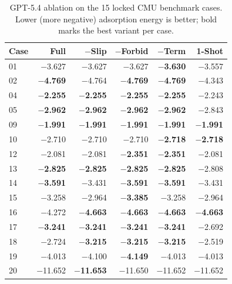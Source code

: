 \begin{table}[h]
\centering
\small
\caption{GPT-5.4 ablation on the 15 locked CMU benchmark cases. Lower (more negative) adsorption energy is better; bold marks the best variant per case.}
\label{tab:si-ablation-gpt54}
\begin{tabular}{lrrrrr}
\toprule
Case & Full & $-$Slip & $-$Forbid & $-$Term & 1-Shot \\
\midrule
01 & $-$3.627 & $-$3.627 & $-$3.627 & \textbf{$-$3.630} & $-$3.557 \\
02 & \textbf{$-$4.769} & $-$4.764 & \textbf{$-$4.769} & \textbf{$-$4.769} & $-$4.343 \\
04 & \textbf{$-$2.255} & \textbf{$-$2.255} & \textbf{$-$2.255} & \textbf{$-$2.255} & $-$2.243 \\
05 & \textbf{$-$2.962} & \textbf{$-$2.962} & \textbf{$-$2.962} & \textbf{$-$2.962} & $-$2.843 \\
09 & \textbf{$-$1.991} & \textbf{$-$1.991} & \textbf{$-$1.991} & \textbf{$-$1.991} & \textbf{$-$1.991} \\
10 & $-$2.710 & $-$2.710 & $-$2.710 & \textbf{$-$2.718} & \textbf{$-$2.718} \\
12 & $-$2.081 & $-$2.081 & \textbf{$-$2.351} & \textbf{$-$2.351} & $-$2.081 \\
13 & \textbf{$-$2.825} & \textbf{$-$2.825} & \textbf{$-$2.825} & \textbf{$-$2.825} & $-$2.808 \\
14 & \textbf{$-$3.591} & $-$3.431 & \textbf{$-$3.591} & \textbf{$-$3.591} & $-$3.431 \\
15 & $-$3.258 & $-$2.964 & \textbf{$-$3.385} & $-$3.258 & $-$2.964 \\
16 & $-$4.272 & \textbf{$-$4.663} & \textbf{$-$4.663} & \textbf{$-$4.663} & \textbf{$-$4.663} \\
17 & \textbf{$-$3.241} & \textbf{$-$3.241} & \textbf{$-$3.241} & \textbf{$-$3.241} & $-$2.692 \\
18 & $-$2.724 & \textbf{$-$3.215} & \textbf{$-$3.215} & \textbf{$-$3.215} & $-$2.519 \\
19 & $-$4.013 & $-$4.100 & \textbf{$-$4.149} & $-$4.013 & $-$4.013 \\
20 & $-$11.652 & \textbf{$-$11.653} & $-$11.650 & $-$11.652 & $-$11.652 \\
\bottomrule
\end{tabular}
\end{table}

